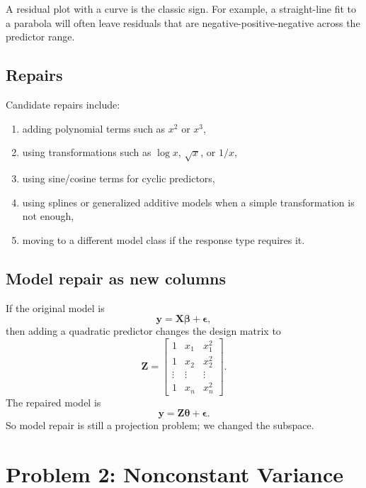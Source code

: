 A residual plot with a curve is the classic sign.  For example, a straight-line fit to a parabola will often leave residuals that are negative-positive-negative across the predictor range.

\subsection*{Repairs}

Candidate repairs include:
\begin{enumerate}
  \item adding polynomial terms such as \(x^2\) or \(x^3\),
  \item using transformations such as \(\log x\), \(\sqrt{x}\), or \(1/x\),
  \item using sine/cosine terms for cyclic predictors,
  \item using splines or generalized additive models when a simple transformation is not enough,
  \item moving to a different model class if the response type requires it.
\end{enumerate}

\subsection*{Model repair as new columns}

If the original model is
\begin{equation}
  \mathbf{y}=\mathbf{X}\boldsymbol{\beta}+\boldsymbol{\epsilon},
\end{equation}
then adding a quadratic predictor changes the design matrix to
\begin{equation}
  \mathbf{Z}=\begin{bmatrix}
    1 & x_1 & x_1^2 \\
    1 & x_2 & x_2^2 \\
    \vdots & \vdots & \vdots \\
    1 & x_n & x_n^2
  \end{bmatrix}.
\end{equation}
The repaired model is
\begin{equation}
  \mathbf{y}=\mathbf{Z}\boldsymbol{\theta}+\boldsymbol{\epsilon}.
\end{equation}
So model repair is still a projection problem; we changed the subspace.

\section{Problem 2: Nonconstant Variance}

